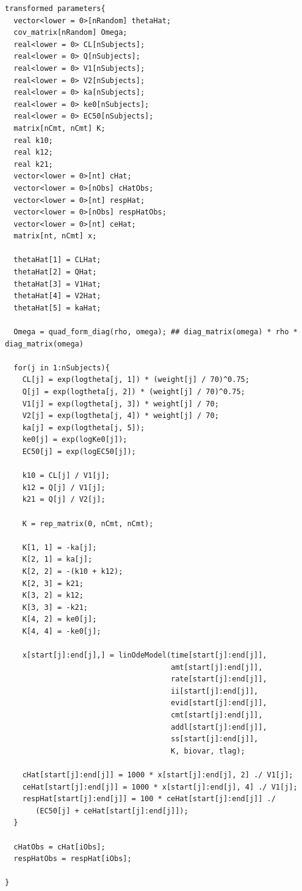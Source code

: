 \documentclass[10pt, reqno, oneside]{amsbook}
\numberwithin{equation}{chapter}
\numberwithin{figure}{chapter}
\numberwithin{table}{chapter}
\theoremstyle{remark}
\begin{document}
\begin{verbatim}
transformed parameters{
  vector<lower = 0>[nRandom] thetaHat;
  cov_matrix[nRandom] Omega;
  real<lower = 0> CL[nSubjects];
  real<lower = 0> Q[nSubjects];
  real<lower = 0> V1[nSubjects];
  real<lower = 0> V2[nSubjects];
  real<lower = 0> ka[nSubjects];
  real<lower = 0> ke0[nSubjects];
  real<lower = 0> EC50[nSubjects];
  matrix[nCmt, nCmt] K;
  real k10;
  real k12;
  real k21;
  vector<lower = 0>[nt] cHat;
  vector<lower = 0>[nObs] cHatObs;
  vector<lower = 0>[nt] respHat;
  vector<lower = 0>[nObs] respHatObs;
  vector<lower = 0>[nt] ceHat;
  matrix[nt, nCmt] x;

  thetaHat[1] = CLHat;
  thetaHat[2] = QHat;
  thetaHat[3] = V1Hat;
  thetaHat[4] = V2Hat;
  thetaHat[5] = kaHat;

  Omega = quad_form_diag(rho, omega); ## diag_matrix(omega) * rho * diag_matrix(omega)

  for(j in 1:nSubjects){
    CL[j] = exp(logtheta[j, 1]) * (weight[j] / 70)^0.75;
    Q[j] = exp(logtheta[j, 2]) * (weight[j] / 70)^0.75;
    V1[j] = exp(logtheta[j, 3]) * weight[j] / 70;
    V2[j] = exp(logtheta[j, 4]) * weight[j] / 70;
    ka[j] = exp(logtheta[j, 5]);
    ke0[j] = exp(logKe0[j]);
    EC50[j] = exp(logEC50[j]);

    k10 = CL[j] / V1[j];
    k12 = Q[j] / V1[j];
    k21 = Q[j] / V2[j];

    K = rep_matrix(0, nCmt, nCmt);

    K[1, 1] = -ka[j];
    K[2, 1] = ka[j];
    K[2, 2] = -(k10 + k12);
    K[2, 3] = k21;
    K[3, 2] = k12;
    K[3, 3] = -k21;
    K[4, 2] = ke0[j];
    K[4, 4] = -ke0[j];

    x[start[j]:end[j],] = linOdeModel(time[start[j]:end[j]],
                                      amt[start[j]:end[j]],
                                      rate[start[j]:end[j]],
                                      ii[start[j]:end[j]],
                                      evid[start[j]:end[j]],
                                      cmt[start[j]:end[j]],
                                      addl[start[j]:end[j]],
                                      ss[start[j]:end[j]],
                                      K, biovar, tlag);

    cHat[start[j]:end[j]] = 1000 * x[start[j]:end[j], 2] ./ V1[j];
    ceHat[start[j]:end[j]] = 1000 * x[start[j]:end[j], 4] ./ V1[j];
    respHat[start[j]:end[j]] = 100 * ceHat[start[j]:end[j]] ./ 
       (EC50[j] + ceHat[start[j]:end[j]]);
  }

  cHatObs = cHat[iObs];
  respHatObs = respHat[iObs];

}
\end{verbatim}
\end{document}
